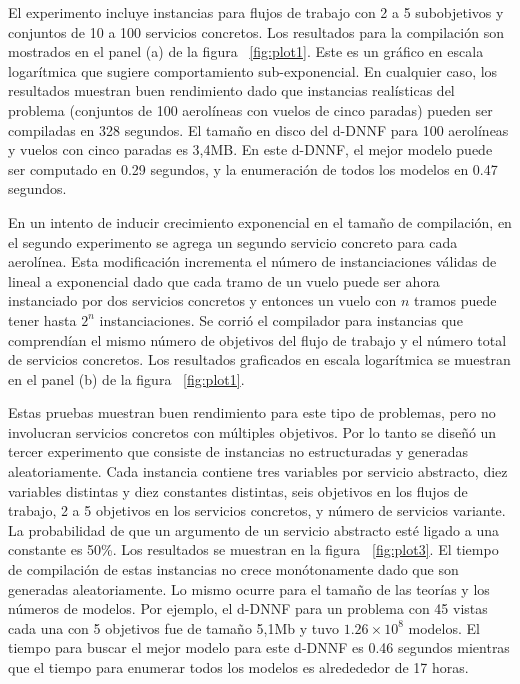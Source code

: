 El experimento incluye instancias para flujos de trabajo con 2 a 5 subobjetivos
y conjuntos de 10 a 100 servicios concretos. Los resultados para la compilación
son mostrados en el panel (a) de la figura ~\ref{fig:plot1}. Este es un gráfico en escala
logarítmica que sugiere comportamiento sub-exponencial. En cualquier caso, los
resultados muestran buen rendimiento dado que instancias realísticas del
problema (conjuntos de 100 aerolíneas con vuelos de cinco paradas) pueden ser
compiladas en 328 segundos. El tamaño en disco del d-DNNF para 100 aerolíneas y
vuelos con cinco paradas es 3,4MB. En este d-DNNF, el mejor modelo puede ser
computado en 0.29 segundos, y la enumeración de todos los modelos en 0.47
segundos.

En un intento de inducir crecimiento exponencial en el tamaño de compilación, en
el segundo experimento se agrega un segundo servicio concreto para cada
aerolínea. Esta modificación incrementa el número de instanciaciones válidas de
lineal a exponencial dado que cada tramo de un vuelo puede ser ahora instanciado
por dos servicios concretos y entonces un vuelo con $n$ tramos puede tener hasta
$2^n$ instanciaciones. Se corrió el compilador para instancias que comprendían
el mismo número de objetivos del flujo de trabajo y el número total de
servicios concretos. Los resultados graficados en escala logarítmica se muestran
en el panel (b) de la figura ~\ref{fig:plot1}.

Estas pruebas muestran buen rendimiento para este tipo de problemas, pero no
involucran servicios concretos con múltiples objetivos. Por lo tanto se
diseñó un tercer experimento que consiste de instancias no estructuradas y
generadas aleatoriamente. Cada instancia contiene tres variables por servicio
abstracto, diez variables distintas y diez constantes distintas, seis
objetivos en los flujos de trabajo, 2 a 5 objetivos en los servicios
concretos, y número de servicios variante. La probabilidad de que un argumento
de un servicio abstracto esté ligado a una constante es 50\%. Los resultados se
muestran en la figura ~\ref{fig:plot3}. El tiempo de compilación de estas instancias no
crece monótonamente dado que son generadas aleatoriamente. Lo mismo ocurre para
el tamaño de las teorías y los números de modelos. Por ejemplo, el d-DNNF para
un problema con 45 vistas cada una con 5 objetivos fue de tamaño 5,1Mb y tuvo
$1.26\times 10^8$ modelos. El tiempo para buscar el mejor modelo para este
d-DNNF es 0.46 segundos mientras que el tiempo para enumerar todos los modelos
es alredededor de 17 horas.

